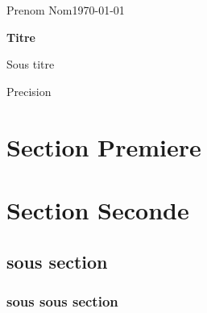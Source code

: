 \documentclass[12pt]{article}
\newcommand{\nomEntier}{Prenom Nom} %
\newcommand{\dateRendu}{\today} %
\newcommand{\titreDoc}{Titre} %
\newcommand{\sousTitreDoc}{Sous titre} %
\newcommand{\sousSousTitreDoc}{Precision} %
\begin{document}
\begin{titlepage}
    \nomEntier \hfill \dateRendu
    \begin{center}
        \vspace*{7cm}
        
        \Huge
        \textbf{\titreDoc}
 
        \vspace{0.5cm}
        \LARGE
        \sousTitreDoc

        \vspace{0.5cm}
        \large
        \sousSousTitreDoc
    \end{center}
 \end{titlepage}
 \thispagestyle{fancy}
\newpage



\tableofcontents
\newpage

\section{Section Premiere}
\lipsum
\section{Section Seconde}
\subsection{sous section}
\subsubsection{sous sous section}
\lipsum
\end{document}
